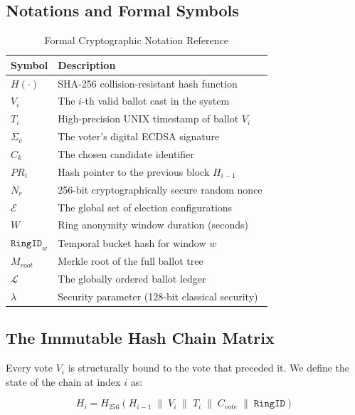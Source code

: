 \documentclass[journal,10pt,twocolumn]{IEEEtran}
\begin{document}
\subsection{Notations and Formal Symbols}

\begin{table}[htbp]
\caption{Formal Cryptographic Notation Reference}
\label{tab:notations}
\centering
\small
{}
\begin{tabularx}{\linewidth}{@{} l X @{}}
\toprule
\textbf{Symbol} & \textbf{Description} \\
\midrule
$H(\cdot)$ & SHA-256 collision-resistant hash function \\
$V_{i}$ & The $i$-th valid ballot cast in the system \\
$T_{i}$ & High-precision UNIX timestamp of ballot $V_{i}$ \\
$\Sigma_{v}$ & The voter's digital ECDSA signature \\
$C_{k}$ & The chosen candidate identifier \\
$PR_{i}$ & Hash pointer to the previous block $H_{i-1}$ \\
$N_{r}$ & 256-bit cryptographically secure random nonce \\
$\mathcal{E}$ & The global set of election configurations \\
$W$ & Ring anonymity window duration (seconds) \\
$\mathtt{RingID}_{w}$ & Temporal bucket hash for window $w$ \\
$M_{root}$ & Merkle root of the full ballot tree \\
$\mathcal{L}$ & The globally ordered ballot ledger \\
$\lambda$ & Security parameter (128-bit classical security) \\
\bottomrule
\end{tabularx}
\end{table}

\subsection{The Immutable Hash Chain Matrix}

Every vote $V_{i}$ is structurally bound to the vote that preceded it. We define the state of the chain at index $i$ as:

\begin{equation}
    H_{i} = H_{256}\!\left( H_{i-1} \;\|\; V_{i} \;\|\; T_{i} \;\|\; C_{vote} \;\|\; \mathtt{RingID} \right)
\end{equation}
\end{document}
